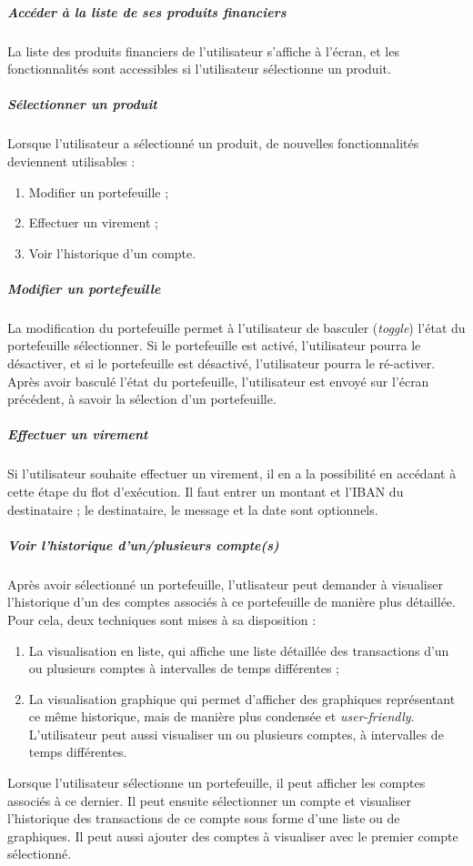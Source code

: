 \subparagraph{Accéder à la liste de ses produits financiers}
La liste des produits financiers de l'utilisateur s'affiche à l'écran, et les fonctionnalités sont accessibles si l'utilisateur sélectionne un produit.


\subparagraph{Sélectionner un produit}
Lorsque l'utilisateur a sélectionné un produit, de nouvelles fonctionnalités deviennent utilisables :
\begin{enumerate}
\item Modifier un portefeuille ;
\item Effectuer un virement ;
\item Voir l'historique d'un compte.
\end{enumerate}


\subparagraph{Modifier un portefeuille}
La modification du portefeuille permet à l'utilisateur de basculer (\emph{toggle}) l'état du portefeuille sélectionner. Si le portefeuille est activé, l'utilisateur pourra le désactiver, et si le portefeuille est désactivé, l'utilisateur pourra le ré-activer. Après avoir basculé l'état du portefeuille, l'utilisateur est envoyé sur l'écran précédent, à savoir la sélection d'un portefeuille.


\subparagraph{Effectuer un virement}
Si l'utilisateur souhaite effectuer un virement, il en a la possibilité en accédant à cette étape du flot d'exécution. Il faut entrer un montant et l'IBAN du destinataire ; le destinataire, le message et la date sont optionnels.


\subparagraph{Voir l'historique d'un/plusieurs compte(s)}
Après avoir sélectionné un portefeuille, l'utlisateur peut demander à visualiser l'historique d'un des comptes associés à ce portefeuille de manière plus détaillée. Pour cela, deux techniques sont mises à sa disposition :
\begin{enumerate}
\item La visualisation en liste, qui affiche une liste détaillée des transactions d'un ou plusieurs comptes à intervalles de temps différentes ;
\item La visualisation graphique qui permet d'afficher des graphiques représentant ce même historique, mais de manière plus condensée et \emph{user-friendly}. L'utilisateur peut aussi visualiser un ou plusieurs comptes, à intervalles de temps différentes.
\end{enumerate}
Lorsque l'utilisateur sélectionne un portefeuille, il peut afficher les comptes associés à ce dernier. Il peut ensuite sélectionner un compte et visualiser l'historique des transactions de ce compte sous forme d'une liste ou de graphiques. Il peut aussi ajouter des comptes à visualiser avec le premier compte sélectionné.


